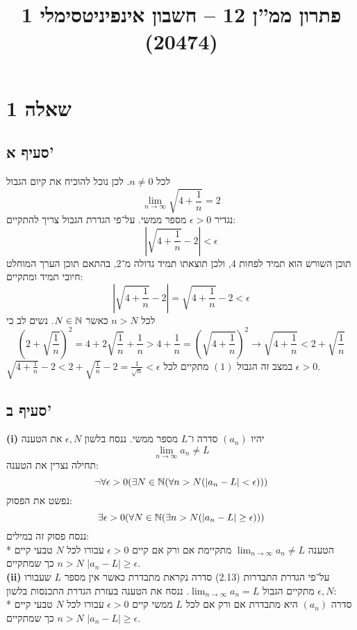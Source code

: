 
\title{פתרון ממ''ן 12 – חשבון אינפיניטסימלי 1 (20474)}


\maketitle
\section{שאלה 1}
\subsection{סעיף א'}
לכל $n \ne 0$. לכן נוכל להוכיח את קיום הגבול
$$
	\lim_{n \to \infty} \sqrt{4 + \frac{1}{n}} = 2
$$
נגדיר $\epsilon > 0$ מספר ממשי. על־פי הגדרת הגבול צריך להתקיים:
$$
	\left| \sqrt{4 + \frac{1}{n}} - 2 \right| < \epsilon
$$
תוכן השורש הוא תמיד לפחות 4, ולכן תוצאתו תמיד גדולה מ־2, בהתאם תוכן הערך המוחלט חיובי תמיד ומתקיים:
$$
	\left| \sqrt{4 + \frac{1}{n}} - 2 \right|
	= \sqrt{4 + \frac{1}{n}} - 2 < \epsilon
$$
לכל $n > N$ כאשר $N \in \mathbb{N}$. נשים לב כי
$$
	{\left(2 + \sqrt{\frac{1}{n}}\right)}^2 = 4 + 2\sqrt{\frac{1}{n}} + \frac{1}{n} > 4 + \frac{1}{n} = {\left(\sqrt{4 + \frac{1}{n}}\right)}^2
	\rightarrow \sqrt{4 + \frac{1}{n}} < 2 + \sqrt{\frac{1}{n}}
$$
 {$\sqrt{4 + \frac{1}{n}} - 2 < 2 + \sqrt{\frac{1}{n}} - 2 = \frac{1}{\sqrt{n}} < \epsilon$ }
במצב זה הגבול $(1)$ מתקיים לכל $\epsilon > 0$.

\subsection{סעיף ב'}
\textbf{(i)}
יהיו $(a_n)$ סדרה ו־$L$ מספר ממשי. ננסח בלשון $\epsilon, N$ את הטענה
$$
	\lim_{n \to \infty} a_n \ne L
$$
תחילה נצרין את הטענה:
$$
	\lnot \forall \epsilon > 0 (
	\exists N \in \mathbb{N} (
	\forall n > N (\left| a_n - L \right| < \epsilon)))
$$
נפשט את הפסוק:
$$
	\exists \epsilon > 0 (
	\forall N \in \mathbb{N} (
	\exists n > N (\left| a_n - L \right| \ge \epsilon)))
$$
ננסח פסוק זה במילים: \\*
הטענה $\lim_{n \to \infty} a_n \ne L$ מתקיימת אם ורק אם
קיים $\epsilon > 0$ עבורו לכל $N$ טבעי קיים $n > N$
כך שמתקיים $\left| a_n - L \right| \ge \epsilon$. \\
\textbf{(ii)}
על־פי הגדרת התבדרות (2.13) סדרה נקראת מתבדרת כאשר אין מספר $L$
שעבורו מתקיים הגבול $\lim_{n \to \infty} a_n = L$.
ננסח את הטענה בעזרת הגדרת התכנסות בלשון $\epsilon, N$: \\*
סדרה $(a_n)$ היא מתבדרת אם ורק אם
לכל $L$ ממשי קיים $\epsilon > 0$ עבורו לכל $N$ טבעי קיים $n > N$
כך שמתקיים $\left| a_n - L \right| \ge \epsilon$.

